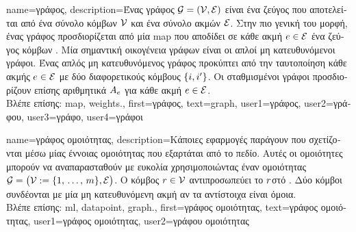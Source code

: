 {name={\foreignlanguage{greek}{γράφος}},
	description={\foreignlanguage{greek}{Ένας γράφος} 
		$\mathcal{G} = \left( \mathcal{V},\mathcal{E} \right)$ \foreignlanguage{greek}{είναι 
		ένα ζεύγος που αποτελείται από ένα σύνολο κόμβων $\mathcal{V}$ και ένα σύνολο ακμών $\mathcal{E}$. Στην πιο γενική του μορφή, ένας γράφος 
		προσδιορίζεται από μία} \gls{map} \foreignlanguage{greek}{που αποδίδει σε κάθε ακμή $e \in \mathcal{E}$ ένα ζεύγος κόμβων} \cite{RockNetworks}. 
		\foreignlanguage{greek}{Μία σημαντική οικογένεια γράφων εί\-ναι οι απλοί μη κατευθυνόμενοι γράφοι. Ένας απλός μη κατευθυνόμενος  
		γράφος προκύπτει από την ταυτοποίηση κάθε ακμής $e \in \mathcal{E}$ με δύο διαφορετικούς κόμβους $\{i,i'\}$. 
		Οι σταθμισμένοι γράφοι προσδιορίζουν επίσης αριθμητικά}  $A_{e}$ 
		\foreignlanguage{greek}{για κάθε ακμή} $e \in \mathcal{E}$.\\
		\foreignlanguage{greek}{Βλέπε επίσης:} \gls{map}, \gls{weights}.},
	first={\foreignlanguage{greek}{γράφος}},
	text={graph},
	user1={\foreignlanguage{greek}{γράφος}}, %
  	user2={\foreignlanguage{greek}{γράφου}}, %
	user3={\foreignlanguage{greek}{γράφο}}, %
	user4={\foreignlanguage{greek}{γράφοι}} %
}

 {name={\foreignlanguage{greek}{γράφος ομοιότητας}}, 
 	description={\foreignlanguage{greek}{Κάποιες εφαρμογές}  
		\foreignlanguage{greek}{παράγουν}  \foreignlanguage{greek}{που σχετίζονται μέσω μίας έννοιας 
		ομοιότητας που εξαρτάται από το πεδίο. Αυτές οι ομοιότητες μπορούν να αναπαρασταθούν με ευκολία
 		χρησιμοποιώντας έναν}  \foreignlanguage{greek}{ομοιότητας 
		$\mathcal{G} = \big(\mathcal{V} := \{1, \,\ldots, \,m\},\mathcal{E}\big)$. 
 		Ο κόμβος $r \in \mathcal{V}$ αντιπροσωπεύει το $r$στό} . 
		\foreignlanguage{greek}{Δύο κόμβοι συνδέονται με μία μη κατευθυνόμενη ακμή αν τα αντίστοιχα}  
 		 \foreignlanguage{greek}{είναι όμοια}. \\
		\foreignlanguage{greek}{Βλέπε επίσης:} \gls{ml}, \gls{datapoint}, \gls{graph}.},
 	first={\foreignlanguage{greek}{γράφος ομοιότητας}},
	text={\foreignlanguage{greek}{γράφος ομοιότητας}},
	user1={\foreignlanguage{greek}{γράφος ομοιότητας}}, %
  	user2={\foreignlanguage{greek}{γράφου ομοιότητας}} %
}

